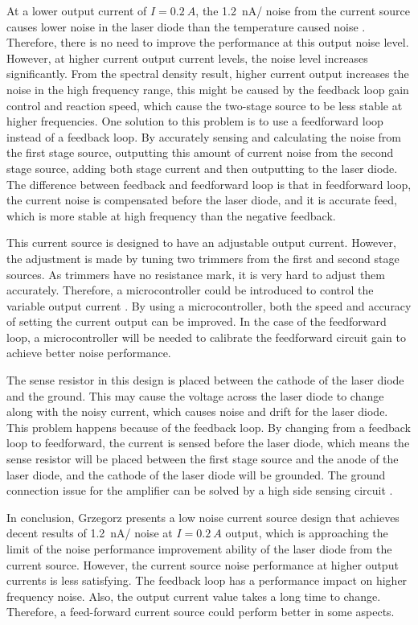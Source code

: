 At a lower output current of $I = \qty{0.2}{A}$, the \qty{1.2}{nA/\sqrthz} noise from the current source causes lower noise in the laser diode than the temperature caused noise \cite{LinewidthQuantumCascadeLaser}.  Therefore, there is no need to improve the performance at this output noise level.  However, at higher current output current levels, the noise level increases significantly.  From the spectral density result, higher current output increases the noise in the high frequency range, this might be caused by the feedback loop gain control and reaction speed, which cause the two-stage source to be less stable at higher frequencies.  One solution to this problem is to use a feedforward loop instead of a feedback loop.  By accurately sensing and calculating the noise from the first stage source, outputting this amount of current noise from the second stage source, adding both stage current and then outputting to the laser diode.  The difference between feedback and feedforward loop is that in feedforward loop, the current noise is compensated before the laser diode, and it is accurate feed, which is more stable at high frequency than the negative feedback.

This current source is designed to have an adjustable output current.  However, the adjustment is made by tuning two trimmers from the first and second stage sources.  As trimmers have no resistance mark, it is very hard to adjust them accurately.  Therefore, a microcontroller could be introduced to control the variable output current \cite{Du_2018}.  By using a microcontroller, both the speed and accuracy of setting the current output can be improved.  In the case of the feedforward loop, a microcontroller will be needed to calibrate the feedforward circuit gain to achieve better noise performance.

The sense resistor in this design is placed between the cathode of the laser diode and the ground.  This may cause the voltage across the laser diode to change along with the noisy current, which causes noise and drift for the laser diode.  This problem happens because of the feedback loop.  By changing from a feedback loop to feedforward, the current is sensed before the laser diode, which means the sense resistor will be placed between the first stage source and the anode of the laser diode, and the cathode of the laser diode will be grounded.  The ground connection issue for the amplifier can be solved by a high side sensing circuit \cite{TI_2019}.
 
In conclusion, Grzegorz presents a low noise current source design that achieves decent results of \qty{1.2}{nA/\sqrthz} noise at $I = \qty{0.2}{A}$ output, which is approaching the limit of the noise performance improvement ability of the laser diode from the current source.  However, the current source noise performance at higher output currents is less satisfying.  The feedback loop has a performance impact on higher frequency noise.  Also, the output current value takes a long time to change.  Therefore, a feed-forward current source could perform better in some aspects.



